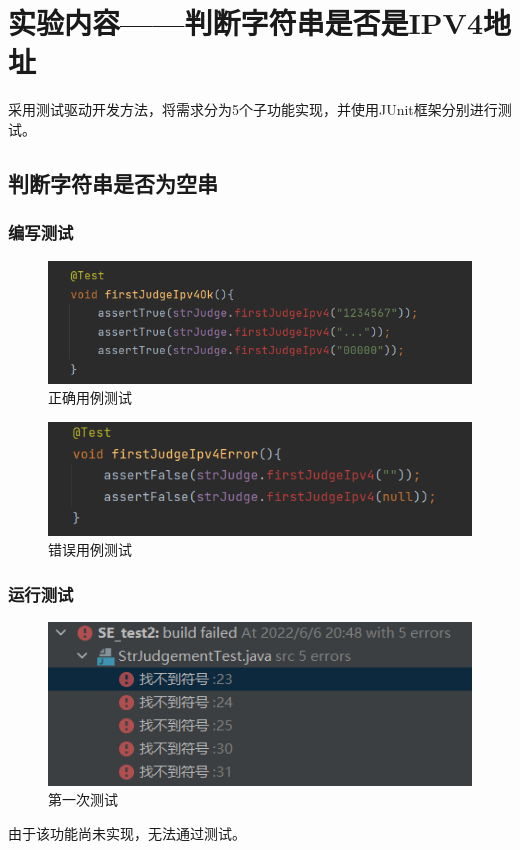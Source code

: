 \documentclass[a4paper]{article}
\begin{document}
\section{实验内容——判断字符串是否是IPV4地址}
采用测试驱动开发方法，将需求分为5个子功能实现，并使用JUnit框架分别进行测试。
\subsection{判断字符串是否为空串}
\subsubsection*{编写测试}
\begin{figure}[h]
    \centering
    \includegraphics[scale=0.8]{1.1.png}
    \caption{正确用例测试}
    \label{fig:2}
\end{figure}
\begin{figure}[h]
    \centering
    \includegraphics[scale=0.9]{1.2.png}
    \caption{错误用例测试}
    \label{fig:3}
\end{figure}
\subsubsection*{运行测试}
\begin{figure}[h]
    \centering
    \includegraphics[scale=0.9]{1.3.png}
    \caption{第一次测试}
    \label{fig:4}
\end{figure}
由于该功能尚未实现，无法通过测试。
\end{document}
